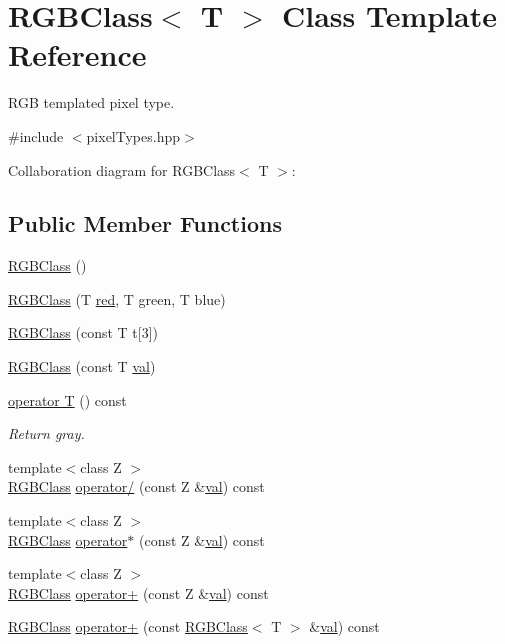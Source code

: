 \hypertarget{classRGBClass}{}\section{R\+G\+B\+Class$<$ T $>$ Class Template Reference}
\label{classRGBClass}


R\+G\+B templated pixel type.  




{\ttfamily \#include $<$pixel\+Types.\+hpp$>$}



Collaboration diagram for R\+G\+B\+Class$<$ T $>$\+:
\subsection*{Public Member Functions}
\begin{DoxyCompactItemize}
\item 
\hyperlink{classRGBClass_a135e16c832ec8cec10443c22dd35b086}{R\+G\+B\+Class} ()
\item 
\hyperlink{classRGBClass_a5bbd612d96cdbb0a7a58d36a70470b78}{R\+G\+B\+Class} (T \hyperlink{png_8h_a785e03b9f52b7b9ca5116a272adc908f}{red}, T green, T blue)
\item 
\hyperlink{classRGBClass_af50effedffdbd0648be86fc302e661df}{R\+G\+B\+Class} (const T t\mbox{[}3\mbox{]})
\item 
\hyperlink{classRGBClass_a4dd63e57f0d6462e895dae19fc89e526}{R\+G\+B\+Class} (const T \hyperlink{jpeglib_8h_aa0ccb5ee6d882ee3605ff47745c6467b}{val})
\item 
\hyperlink{classRGBClass_a210719b43e22718a1d530b4413c7a96a}{operator T} () const 
\begin{DoxyCompactList}\small\item\em Return gray. \end{DoxyCompactList}\item 
{\footnotesize template$<$class Z $>$ }\\\hyperlink{classRGBClass}{R\+G\+B\+Class} \hyperlink{classRGBClass_aa4a7c0277dd375bcd44f2b8472014cb4}{operator/} (const Z \&\hyperlink{jpeglib_8h_aa0ccb5ee6d882ee3605ff47745c6467b}{val}) const 
\item 
{\footnotesize template$<$class Z $>$ }\\\hyperlink{classRGBClass}{R\+G\+B\+Class} \hyperlink{classRGBClass_ae4d6f646c328b0beaa8e29d4b9ad32be}{operator$\ast$} (const Z \&\hyperlink{jpeglib_8h_aa0ccb5ee6d882ee3605ff47745c6467b}{val}) const 
\item 
{\footnotesize template$<$class Z $>$ }\\\hyperlink{classRGBClass}{R\+G\+B\+Class} \hyperlink{classRGBClass_ac16962ccb9e5fb4e2d156a72176c86d2}{operator+} (const Z \&\hyperlink{jpeglib_8h_aa0ccb5ee6d882ee3605ff47745c6467b}{val}) const 
\item 
\hyperlink{classRGBClass}{R\+G\+B\+Class} \hyperlink{classRGBClass_a30c6ca8345de1881cd29e84fd3fc3cd4}{operator+} (const \hyperlink{classRGBClass}{R\+G\+B\+Class}$<$ T $>$ \&\hyperlink{jpeglib_8h_aa0ccb5ee6d882ee3605ff47745c6467b}{val}) const 
\end{DoxyCompactItemize}
